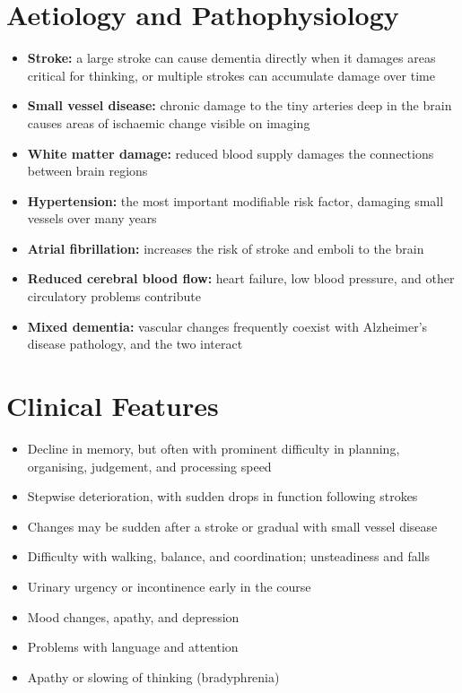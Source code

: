 \section*{Aetiology and Pathophysiology}
\begin{itemize}
    \item \textbf{Stroke:} a large stroke can cause dementia directly when it damages areas critical for thinking, or multiple strokes can accumulate damage over time
    \item \textbf{Small vessel disease:} chronic damage to the tiny arteries deep in the brain causes areas of ischaemic change visible on imaging
    \item \textbf{White matter damage:} reduced blood supply damages the connections between brain regions
    \item \textbf{Hypertension:} the most important modifiable risk factor, damaging small vessels over many years
    \item \textbf{Atrial fibrillation:} increases the risk of stroke and emboli to the brain
    \item \textbf{Reduced cerebral blood flow:} heart failure, low blood pressure, and other circulatory problems contribute
    \item \textbf{Mixed dementia:} vascular changes frequently coexist with Alzheimer's disease pathology, and the two interact
\end{itemize}

\section*{Clinical Features}
\begin{itemize}
    \item Decline in memory, but often with prominent difficulty in planning, organising, judgement, and processing speed
    \item Stepwise deterioration, with sudden drops in function following strokes
    \item Changes may be sudden after a stroke or gradual with small vessel disease
    \item Difficulty with walking, balance, and coordination; unsteadiness and falls
    \item Urinary urgency or incontinence early in the course
    \item Mood changes, apathy, and depression
    \item Problems with language and attention
    \item Apathy or slowing of thinking (bradyphrenia)
\end{itemize}

